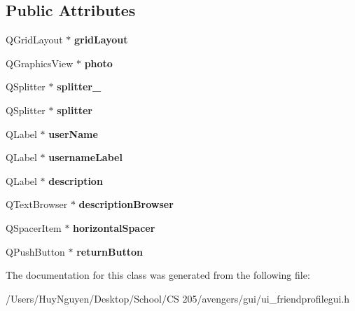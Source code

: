 \subsection*{Public Attributes}
\begin{DoxyCompactItemize}
\item 
Q\+Grid\+Layout $\ast$ {\bfseries grid\+Layout}\hypertarget{classUi__FriendProfileGUI_aaad4b037169f66a91b143b16c1c65cf1}{}\label{classUi__FriendProfileGUI_aaad4b037169f66a91b143b16c1c65cf1}

\item 
Q\+Graphics\+View $\ast$ {\bfseries photo}\hypertarget{classUi__FriendProfileGUI_aae04f01df101a7be6fbfc3201aa5c3ed}{}\label{classUi__FriendProfileGUI_aae04f01df101a7be6fbfc3201aa5c3ed}

\item 
Q\+Splitter $\ast$ {\bfseries splitter\+\_}\hypertarget{classUi__FriendProfileGUI_a00e5137b3e074560d15d5ae57c0db9cf}{}\label{classUi__FriendProfileGUI_a00e5137b3e074560d15d5ae57c0db9cf}

\item 
Q\+Splitter $\ast$ {\bfseries splitter}\hypertarget{classUi__FriendProfileGUI_a34b1c5ff8b42b483b99858fe41ecea49}{}\label{classUi__FriendProfileGUI_a34b1c5ff8b42b483b99858fe41ecea49}

\item 
Q\+Label $\ast$ {\bfseries user\+Name}\hypertarget{classUi__FriendProfileGUI_aff0d35f35a000c19d1dc30251b8e4bf6}{}\label{classUi__FriendProfileGUI_aff0d35f35a000c19d1dc30251b8e4bf6}

\item 
Q\+Label $\ast$ {\bfseries username\+Label}\hypertarget{classUi__FriendProfileGUI_a9a1fae3f523659066c7cde7978735e63}{}\label{classUi__FriendProfileGUI_a9a1fae3f523659066c7cde7978735e63}

\item 
Q\+Label $\ast$ {\bfseries description}\hypertarget{classUi__FriendProfileGUI_a231c94ef945dd89cc17ec76d83024306}{}\label{classUi__FriendProfileGUI_a231c94ef945dd89cc17ec76d83024306}

\item 
Q\+Text\+Browser $\ast$ {\bfseries description\+Browser}\hypertarget{classUi__FriendProfileGUI_a845db948710c56e6c86da18074a8118d}{}\label{classUi__FriendProfileGUI_a845db948710c56e6c86da18074a8118d}

\item 
Q\+Spacer\+Item $\ast$ {\bfseries horizontal\+Spacer}\hypertarget{classUi__FriendProfileGUI_af64c51e59b8f8e0381176a2a4054e763}{}\label{classUi__FriendProfileGUI_af64c51e59b8f8e0381176a2a4054e763}

\item 
Q\+Push\+Button $\ast$ {\bfseries return\+Button}\hypertarget{classUi__FriendProfileGUI_ac3b7516d710a585bea2457d33a950bec}{}\label{classUi__FriendProfileGUI_ac3b7516d710a585bea2457d33a950bec}

\end{DoxyCompactItemize}


The documentation for this class was generated from the following file\+:\begin{DoxyCompactItemize}
\item 
/\+Users/\+Huy\+Nguyen/\+Desktop/\+School/\+C\+S 205/avengers/gui/ui\+\_\+friendprofilegui.\+h\end{DoxyCompactItemize}
